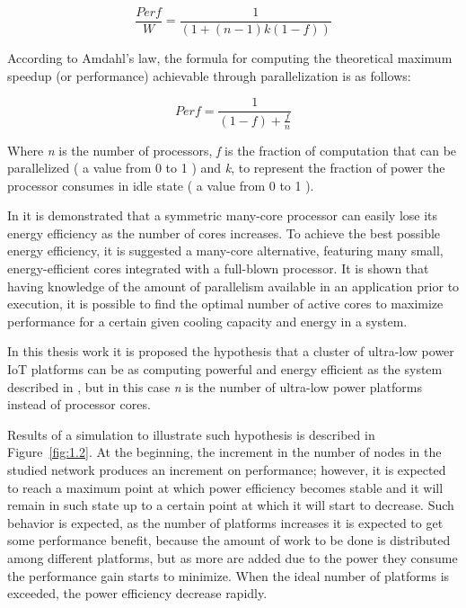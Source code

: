 \begin{equation}\label{eq:1} \frac{Perf}{W} = \frac{1}{(1 + (n -1 ) k (1 - f))}
\end{equation}

According to Amdahl's law\cite{Dong}, the formula for computing the theoretical
maximum speedup (or performance) achievable through parallelization is as
follows: 

\begin{equation}\label{eq:2} Perf = \frac{1}{(1 -f) + \frac{f}{n}}
\end{equation}

Where \textit{n} is the number of processors,  \textit{f} is the fraction of
computation that can be parallelized ( a value from 0 to 1 ) and \textit{k}, to
represent the fraction of power the processor consumes in idle state  ( a value
from 0 to 1 ).

In \cite{Dong} it is demonstrated that a symmetric many-core
processor can easily  lose its energy efficiency as the number of cores
increases. To achieve the  best possible energy efficiency, it is 
suggested a many-core alternative, featuring many small, energy-efficient cores
integrated with a full-blown processor. It is shown that having knowledge of
the amount of parallelism available in an application prior to execution, it is
possible to  find the optimal number of active cores to maximize performance
for a certain given cooling capacity and energy in a system.

In this thesis work it is proposed the hypothesis that a cluster of ultra-low
power IoT platforms can be as computing powerful and energy efficient as the
system described in \cite{Dong}, but in this case \textit{n} is the number of
ultra-low power platforms instead of processor cores.

Results of a simulation to illustrate such hypothesis is described in
Figure~\ref{fig:1.2}.  At the beginning, the increment in the number of nodes
in the studied network produces an increment on performance; however, it is
expected to reach a maximum point at which power efficiency becomes stable and
it will remain in such state up to a certain point at which it will start to
decrease. Such behavior is expected, as the number of platforms increases it is
expected to get some performance benefit, because the amount of work to be done
is distributed among different platforms, but as more are added due to the
power they consume the performance gain starts to minimize. When the ideal
number of platforms is exceeded, the power efficiency decrease rapidly.

